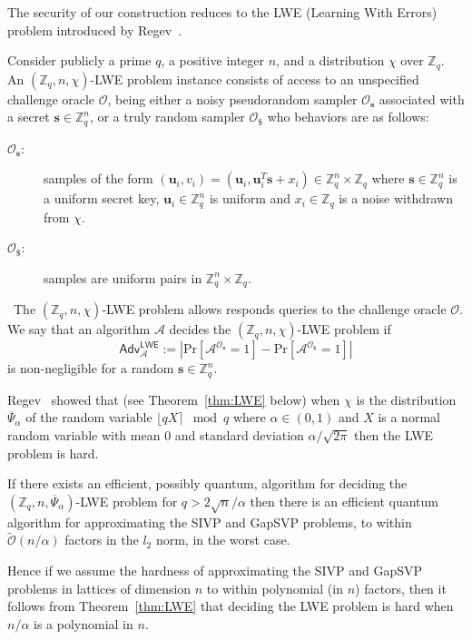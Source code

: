 \documentclass[runningheads]{llncs}
\def\ZZ{\mathbb{Z}}
\def\cal{\mathcal}
\def\bf{\mathbf}
\def\Pr{\mathrm{Pr}}
\def\Adv{\mathsf{Adv}}
\def\u{\bf{u}}
\def\s{\bf{s}}
\begin{document}
	The security of our construction reduces to the LWE (Learning With Errors) problem introduced by Regev~\cite{Regev05}.
	\begin{definition}
		Consider publicly a prime $q$, a positive integer $n$, and a distribution $\chi$ over $\ZZ_q$. An $(\ZZ_q,n,\chi)$-LWE problem instance consists of access to an unspecified challenge oracle $\cal{O}$, being either a noisy pseudorandom sampler $\cal{O}_\s$ associated with a secret $\s\in\ZZ_q^n$, or a truly random sampler $\cal{O}_\$$ who behaviors are as follows:
		\begin{description}
			\item[$\cal{O}_\s$:] samples of the form $(\u_i,v_i)=(\u_i,\u_i^T\s+x_i)\in\ZZ_q^n\times\ZZ_q$ where $\s\in\ZZ_q^n$ is a uniform secret key, $\u_i\in\ZZ_q^n$ is uniform and $x_i\in\ZZ_q$ is a noise withdrawn from $\chi$.
			\item[$\cal{O}_\$$:] samples are uniform pairs in $\ZZ_q^n\times\ZZ_q$.
		\end{description}\
		The $(\ZZ_q,n,\chi)$-LWE problem allows responds queries to the challenge oracle $\cal{O}$. We say that an algorithm $\cal{A}$ decides the $(\ZZ_q,n,\chi)$-LWE problem if 
		$$\Adv_{\cal{A}}^{\mathsf{LWE}}:=\left|\Pr[\cal{A}^{\cal{O}_\s}=1] - \Pr[\cal{A}^{\cal{O}_\$}=1] \right|$$    
		is non-negligible for a random $\s\in\ZZ_q^n$.
	\end{definition}
	Regev~\cite{Regev05} showed that (see Theorem~\ref{thm:LWE} below) when $\chi$ is the distribution $\overline{\Psi}_\alpha$ of the random variable $\lfloor qX\rceil\mod q$ where $\alpha\in(0,1)$ and $X$ is a normal random variable with mean $0$ and standard deviation $\alpha/\sqrt{2\pi}$ then the LWE problem is hard. 
	\begin{theorem}\label{thm:LWE}%
		If there exists an efficient, possibly quantum, algorithm for deciding the $(\ZZ_q,n,\overline{\Psi}_\alpha)$-LWE problem for $q>2\sqrt{n}/\alpha$ then there is an efficient quantum algorithm for approximating the SIVP and GapSVP problems, to within $\tilde{\cal{O}}(n/\alpha)$ factors in the $l_2$ norm, in the worst case.
	\end{theorem}
	Hence if we assume  the hardness of approximating the SIVP and GapSVP problems in lattices of dimension $n$ to within polynomial (in $n$) factors, then it follows from Theorem~\ref{thm:LWE} that deciding the LWE problem is hard when $n/\alpha$ is a polynomial in $n$.
\end{document}
